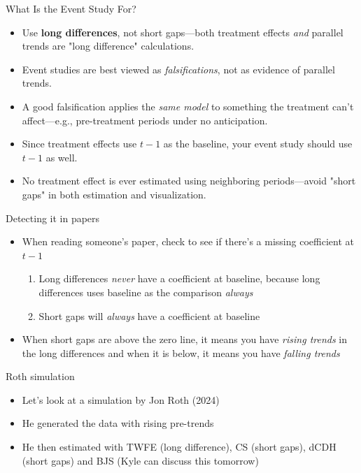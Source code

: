 \documentclass{beamer}
\begin{document}
\begin{frame}{What Is the Event Study For?}

\begin{itemize}
\item Use \textbf{long differences}, not short gaps—both treatment effects \emph{and} parallel trends are "long difference" calculations.
\item Event studies are best viewed as \textit{falsifications}, not as evidence of parallel trends.
\item A good falsification applies the \textit{same model} to something the treatment can’t affect—e.g., pre-treatment periods under no anticipation.
\item Since treatment effects use $t-1$ as the baseline, your event study should use $t-1$ as well.
\item No treatment effect is ever estimated using neighboring periods—avoid "short gaps" in both estimation and visualization.
\end{itemize}

\end{frame}

\begin{frame}{Detecting it in papers}

\begin{itemize}

\item When reading someone's paper, check to see if there's a missing coefficient at $t-1$ 
	\begin{enumerate}
	\item Long differences \emph{never} have a coefficient at baseline, because long differences uses baseline as the comparison \emph{always}
	\item Short gaps will \emph{always} have a coefficient at baseline
	\end{enumerate}
\item When short gaps are above the zero line, it means you have \emph{rising trends} in the long differences and when it is below, it means you have \emph{falling trends}

\end{itemize}

\end{frame}


\begin{frame}{Roth simulation}

\begin{itemize}
\item Let's look at a simulation by Jon Roth (2024) 
\item He generated the data with rising pre-trends 
\item He then estimated with TWFE (long difference), CS (short gaps), dCDH (short gaps) and BJS (Kyle can discuss this tomorrow)
\end{itemize}

\end{frame}
\end{document}
